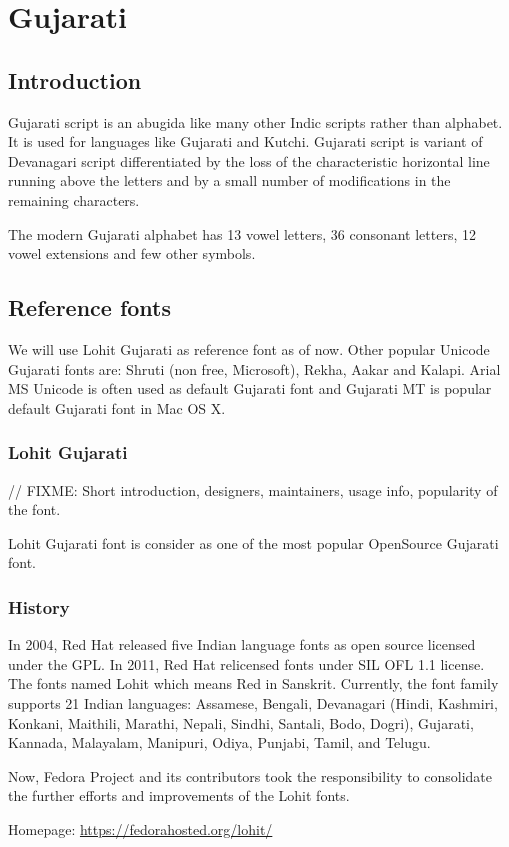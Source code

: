 \chapter{Gujarati}
\section{Introduction}

Gujarati script is an abugida like many other Indic scripts rather than
alphabet. It is used for languages like Gujarati and Kutchi. Gujarati script is
variant of Devanagari script differentiated by the loss of the characteristic
horizontal line running above the letters and by a small number of
modifications in the remaining characters.

The modern Gujarati alphabet has 13 vowel letters, 36 consonant letters, 12
vowel extensions and few other symbols.

\section{Reference fonts}

We will use Lohit Gujarati as reference font as of now. Other popular Unicode
Gujarati fonts are: Shruti (non free, Microsoft), Rekha, Aakar and Kalapi. Arial
MS Unicode is often used as default Gujarati font and Gujarati MT is popular
default Gujarati font in Mac OS X.

\subsection{Lohit Gujarati}
// FIXME: Short introduction, designers, maintainers, usage info, popularity of
the font.

Lohit Gujarati font is consider as one of the most popular OpenSource Gujarati
font.

\subsection{History}
In 2004, Red Hat released five Indian language fonts as open source licensed
under the GPL. In 2011, Red Hat relicensed fonts under SIL OFL 1.1 license.
The fonts named Lohit which means Red in Sanskrit. Currently, the font family
supports 21 Indian languages: Assamese, Bengali, Devanagari (Hindi, Kashmiri,
Konkani, Maithili, Marathi, Nepali, Sindhi, Santali, Bodo, Dogri), Gujarati,
Kannada, Malayalam, Manipuri, Odiya, Punjabi, Tamil, and Telugu.

Now, Fedora Project and its contributors took the responsibility to consolidate
the further efforts and improvements of the Lohit fonts.

Homepage: {\url{https://fedorahosted.org/lohit/}}

